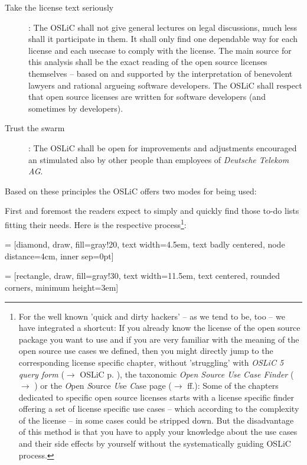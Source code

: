 \begin{description}
  \item[Take the license text seriously]: The OSLiC shall not give general
  lectures on legal discussions, much less shall it participate in them. It
  shall only find one dependable way for each license and each usecase to comply
  with the license. The main source for this analysis shall be the exact reading
  of the open source licenses themselves -- based on and supported by the
  interpretation of benevolent lawyers and rational argueing software
  developers. The OSLiC shall respect that open source licenses are written for
  software developers (and sometimes by developers).
  
  \item[Trust the swarm]: The OSLiC shall be open for improvements and
  adjustments encouraged an stimulated also by other people than employees of
  \emph{Deutsche Telekom AG}.
\end{description}

Based on these principles the OSLiC offers two modes for being used:

First and foremost the readers expect to simply and quickly find those to-do
lists fitting their needs. Here is the respective process\footnote{For the well
known 'quick and dirty hackers' -- as we tend to be, too -- we have integrated a
shortcut: If you already know the license of the open source package you want to
use and if you are very familiar with the meaning of the open source use cases
we defined, then you might directly jump to the corresponding license specific
chapter, without 'struggling' with \textit{OSLiC 5 query form} ($\rightarrow$
OSLiC p. \pageref{OSLiCStandardFormForGatheringInformation}), the taxonomic
\textit{Open Source Use Case Finder} ($\rightarrow$
\pageref{OSLiCUseCaseFinder}) or the \textit{O}pen \textit{S}ource \textit{U}se
\textit{C}ase page ($\rightarrow$ \pageref{OSUCList}ff.): Some of the chapters
dedicated to specific open source licenses starts with a license specific
finder offering a set of license specific use cases -- which according to the
complexity of the license -- in some cases could be stripped down. But the
disadvantage of this method is that you have to apply your knowledge about the
use cases and their side effects by yourself without the systematically guiding
OSLiC process.}:

 = [diamond, draw, fill=gray!20, 
    text width=4.5em, text badly centered, node distance=4cm, inner sep=0pt]

 = [rectangle, draw, fill=gray!30, 
    text width=11.5em, text centered, rounded corners, minimum height=3em]
 
